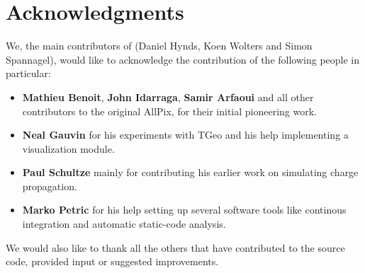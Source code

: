 \section{Acknowledgments}
We, the main contributors of \apsq (Daniel Hynds, Koen Wolters and Simon Spannagel), would like to acknowledge the contribution of the following people in particular:
\begin{itemize}
\item \textbf{Mathieu Benoit}, \textbf{John Idarraga}, \textbf{Samir Arfaoui} and all other contributors to the original AllPix, for their initial pioneering work.
\item \textbf{Neal Gauvin} for his experiments with TGeo and his help implementing a visualization module.
\item \textbf{Paul Schultze} mainly for contributing his earlier work on simulating charge propagation.
\item \textbf{Marko Petric} for his help setting up several software tools like continous integration and automatic static-code analysis.
\end{itemize}
We would also like to thank all the others that have contributed to the source code, provided input or suggested improvements. 
